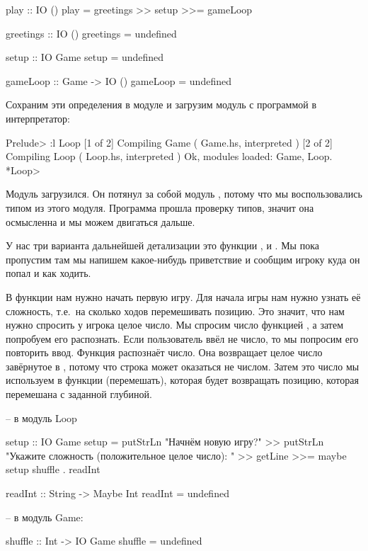 \begin{code}
play :: IO ()
play = greetings >> setup >>= gameLoop

greetings :: IO ()
greetings = undefined

setup :: IO Game
setup = undefined

gameLoop :: Game -> IO ()
gameLoop = undefined
\end{code}

Сохраним эти определения в модуле  и загрузим модуль 
с программой в интерпретатор:

\begin{code}
Prelude> :l Loop
[1 of 2] Compiling Game             ( Game.hs, interpreted )
[2 of 2] Compiling Loop             ( Loop.hs, interpreted )
Ok, modules loaded: Game, Loop.
*Loop> 
\end{code}

Модуль загрузился. Он потянул за собой модуль ,
потому что мы воспользовались типом  из этого модуля.
Программа прошла проверку типов, значит она осмысленна и
мы можем двигаться дальше. 

У нас три варианта дальнейшей детализации это функции 
,  и . Мы пока
пропустим  там мы напишем какое-нибудь 
приветствие и сообщим игроку куда он попал и как ходить. 

В функции  нам нужно начать первую игру.
Для начала игры нам нужно узнать её сложность, т.е.~на
сколько ходов перемешивать позицию. Это значит, что
нам нужно спросить у игрока целое число. Мы спросим
число функцией , а затем попробуем его распознать.
Если пользователь ввёл не число, то мы попросим его повторить ввод.
Функция \mbox{} распознаёт число. 
Она возвращает целое число завёрнутое в , потому что 
строка может оказаться не числом. Затем это число мы используем 
в функции  (перемешать), которая будет возвращать
позицию, которая перемешана с заданной глубиной.

\begin{code}
-- в модуль Loop

setup :: IO Game
setup = putStrLn "Начнём новую игру?" >>
    putStrLn "Укажите сложность (положительное целое число): " >>
    getLine >>= maybe setup shuffle . readInt 

readInt :: String -> Maybe Int
readInt = undefined

-- в модуль Game:

shuffle :: Int -> IO Game
shuffle = undefined
\end{code}


